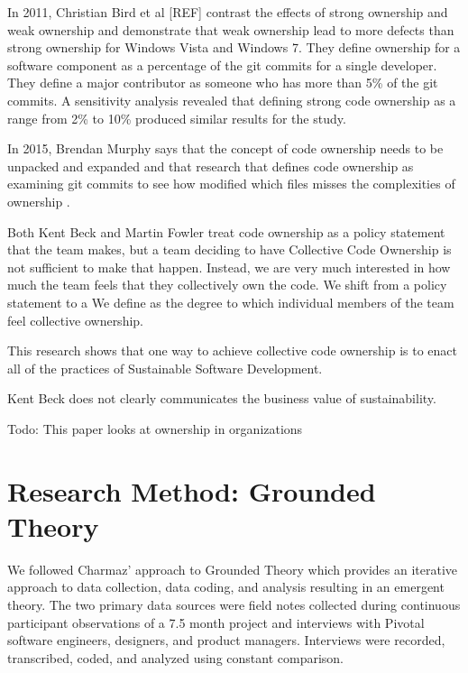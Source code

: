 In 2011, Christian Bird et al [REF] contrast the effects of strong ownership and weak ownership and demonstrate that weak ownership lead to more defects than strong ownership for Windows Vista and Windows 7. They define ownership for a software component as a percentage of the git commits for a single developer. They define a major contributor as someone who has more than 5\% of the git commits. A sensitivity analysis revealed that defining strong code ownership as a range from 2\% to 10\% produced similar results for the study.

In 2015, Brendan Murphy says that the concept of code ownership needs to be unpacked and expanded and that research that defines code ownership as examining git commits to see how modified which files misses the complexities of ownership \cite{MurphyIEEESoftware}.

Both Kent Beck and Martin Fowler treat code ownership as a policy statement that the team makes, but a team deciding to have Collective Code Ownership is not sufficient to make that happen.  Instead, we are very much interested in how much the team feels that they collectively own the code. We shift from a policy statement to a  We define  as the degree to which individual members of the team feel collective ownership.  

This research shows that one way to achieve collective code ownership is to enact all of the practices of Sustainable Software Development.

Kent Beck does not clearly communicates the business value of sustainability. 

Todo: This paper looks at ownership in organizations \cite{PierceOwnershipInOrganizations}
\section{Research Method: Grounded Theory}
\label{ResearchMethod}

We followed Charmaz' approach to Grounded Theory \cite{Charmaz} which provides an iterative approach to data collection, data coding, and analysis resulting in an emergent theory. The two primary data sources were field notes collected during continuous participant observations of a 7.5 month project and interviews with Pivotal software engineers, designers, and product managers. Interviews were recorded, transcribed, coded, and analyzed using constant comparison. 

